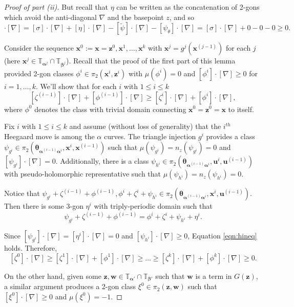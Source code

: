 \documentclass[11pt]{article}
\theoremstyle{plain} \newtheorem{thm}{Theorem}[subsection]
\theoremstyle{plain} \newtheorem{cor}[thm]{Corollary}
\theoremstyle{plain} \newtheorem{prop}[thm]{Proposition}
\theoremstyle{plain} \newtheorem{conj}[thm]{Conjecture}
\theoremstyle{plain} \newtheorem{lem}[thm]{Lemma}
\theoremstyle{definition} \newtheorem{df}[thm]{Definition}
\theoremstyle{remark} \newtheorem{rmk}[thm]{Remark}
\theoremstyle{remark} \newtheorem{obs}[thm]{Observation}
\newcommand{\tld}[1]{\widetilde{#1}}
\newcommand{\ba}{\boldsymbol{\alpha}}
\newcommand{\bb}{\boldsymbol{\beta}}
\newcommand{\bx}{\mathbf{x}}
\newcommand{\bw}{\mathbf{w}}
\newcommand{\bu}{\mathbf{u}}
\newcommand{\bz}{\mathbf{z}}
\newcommand{\thet}[1]{\boldsymbol{\theta}_{#1}}
\newcommand{\tor}[1]{\mathbb{T}_{#1}}
\newcommand{\AD}{\nabla}
\begin{document}
\begin{proof}[Proof of part (ii)]
But recall that $\eta$ can be written as the concatenation of 2-gons which avoid the anti-diagonal $\AD$ and the basepoint $z$, and so
\begin{equation*}
[\zeta^{k}]\cdot[\AD] = [\sigma]\cdot[\AD] + [\eta]\cdot[\AD] - [\tld{\psi}]\cdot[\AD] - [\psi_{\theta}]\cdot[\AD] = [\sigma]\cdot[\AD] + 0 - 0 - 0 \geq 0.
\end{equation*}

Consider the sequence $\bx^0:=\bx = \bz^0, \bx^1, \ldots, \bx^k$ with $\bx^j = g^j(\bx^{(j-1)})$ for each $j$ (here $\bx^j \in \tor{\ba^j} \cap \tor{\bb^j}$).  Recall that the proof of the first part of this lemma provided 2-gon classes $\phi^{i} \in \pi_{2}(\bx^{i}, \bz^{i})$ with $\mu(\phi^{i}) = 0$ and $[\phi^{i}] \cdot [\AD] \geq 0$ for $i = 1, \ldots, k.$  We'll show that for each $i$ with $1 \leq i \leq k$
\begin{equation}\label{eqn:hineq}
[\zeta^{(i-1)}]\cdot [\AD] + [\phi^{(i-1)}]\cdot [\AD] \geq [\zeta^i]\cdot [\AD] + [\phi^i]\cdot [\AD],
\end{equation}
where $\phi^0$ denotes the class with trivial domain connecting $\bx^0 = \bz^0 = \bx$ to itself.

Fix $i$ with $1 \leq i \leq k$ and assume (without loss of generality) that the $i^{th}$ Heegaard move is among the $\alpha$ curves.  The triangle injection $g^i$ provides a class $\psi_{g^{i}} \in \pi_{2}(\thet{\ba^{(i-1)}\ba^i}, \bx^{i}, \bx^{(i-1)})$ such that $\mu(\psi_{g^{i}}) =n_z(\psi_{g^i})=  0$ and $[\psi_{g^{i}}] \cdot [\AD] = 0$.  Additionally, there is a class $\psi_{h^{i}} \in \pi_{2}(\thet{\ba^{(i-1)}\ba^{i}}, \bu^{i}, \bu^{(i-1)})$ with pseudo-holomorphic representative such that $\mu(\psi_{h^{i}}) = n_z(\psi_{h^{i}}) =  0$.

Notice that $\psi_{g^{i}} + \zeta^{(i-1)} + \phi^{(i-1)}, \phi^{i} + \zeta^{i} + \psi_{h^{i}} \in \pi_{2}(\thet{\ba^{(i-1)}\ba^{i}}, \bx^{i}, \bu^{(i-1)})$.  Then there is some 3-gon $\eta^{i}$ with triply-periodic domain such that 
$$\psi_{g^{i}} + \zeta^{(i-1)} + \phi^{(i-1)} = \phi^{i} + \zeta^{i} + \psi_{h^{i}} + \eta^{i}.$$

Since $[\psi_{g^{i}}]\cdot[\AD] = [\eta^{i}]\cdot[\AD] = 0$ and $[\psi_{h^{i}}]\cdot[\AD]\geq 0$, Equation \ref{eqn:hineq} holds.  Therefore,
$$ [\zeta^0]\cdot [\AD] \geq [\zeta^1]\cdot [\AD] + [\phi^1]\cdot [\AD] \geq \ldots \geq [\zeta^k]\cdot [\AD] + [\phi^k]\cdot [\AD] \geq 0.$$


On the other hand, given some $\bz, \bw \in \tor{\ba'} \cap \tor{\bb'}$ such that $\bw$ is a term in $G(\bz)$, a similar argument produces a 2-gon class $\xi^{0} \in \pi_{2}(\bz, \bw)$ such that $[\xi^{0}]\cdot[\AD] \geq 0$ and $\mu(\xi^{0}) = -1.$
\end{proof}
\end{document}
